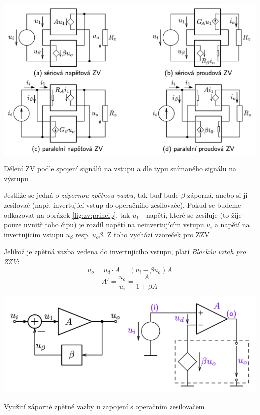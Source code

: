 \documentclass[a4paper,12pt]{article}   %
\begin{document}
\begin{schema}[h!]
    \centering
    \includegraphics[width=.8\textwidth]{ZV-obvody.png}
    \caption{Dělení ZV podle spojení signálů na vstupu a dle typu snímaného signálu na výstupu}
    \label{fig:ZV:deleni}
\end{schema}


Jestliže se jedná o \textit{zápornou zpětnou vazbu}, tak buď bude $\beta$ záporná, anebo si ji  zesilovač (např. invertující vstup do operačního zesilovače). Pokud se budeme odkazovat na obrázek \ref{fig:zv:princip}, tak $u_1$ - napětí, které se zesiluje (to žije pouze uvnitř toho čipu) je rozdíl napětí na neinvertujícím vstupu $u_i$ a napětí na invertujícím vstupu $u_\beta$ resp. $u_o\beta$. Z toho vychází vzoreček pro ZZV

Jelikož je zpětná vazba vedena do invertujícího vstupu, platí \textit{Blackův vztah pro ZZV}:
\begin{equation*}
    u_o = u_d\cdot A = (u_i -\beta u_o) A
\end{equation*}
\begin{equation}
    A' = \frac{u_o}{u_i} = \frac{A}{1+\beta A}
    \label{eq:vysledne:zesileni}
\end{equation}

\begin{schema}[h!]
    \centering
    \includegraphics[width=.7\textwidth]{ZZV-OZ.png}
    \caption{Využití záporné zpětné vazby u zapojení s operačním zesilovačem}
    \label{fig:opamp:ZZV}
\end{schema}
\end{document}

